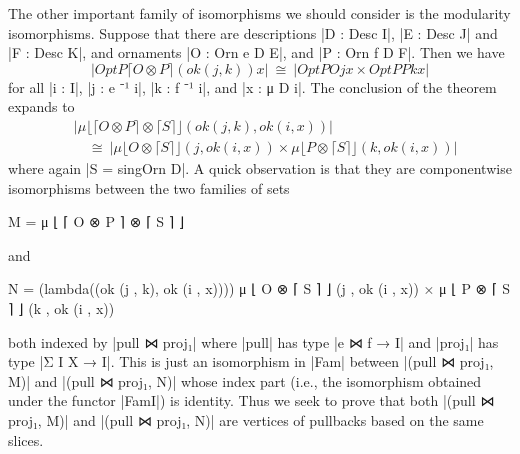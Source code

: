 The other important family of isomorphisms we should consider is the modularity isomorphisms.
Suppose that there are descriptions |D : Desc I|, |E : Desc J| and |F : Desc K|, and ornaments |O : Orn e D E|, and |P : Orn f D F|.
Then we have
\[ |OptP ⌈ O ⊗ P ⌉ (ok (j , k)) x| ~\cong~ |OptP O j x × OptP P k x| \]
for all |i : I|, |j : e ⁻¹ i|, |k : f ⁻¹ i|, and |x : μ D i|.
The conclusion of the theorem expands to
\begin{align}
& |μ ⌊ ⌈ O ⊗ P ⌉ ⊗ ⌈ S ⌉ ⌋ (ok (j , k) , ok (i , x))| \nonumber \\
& {\quad\cong~} |μ ⌊ O  ⊗ ⌈ S ⌉ ⌋ (j , ok (i , x)) × μ ⌊ P  ⊗ ⌈ S ⌉ ⌋ (k ,  ok (i , x))|
\label{eq:modularity}
\end{align}
where again |S = singOrn D|.
A quick observation is that they are componentwise isomorphisms between the two families of sets
\savecolumns
\begin{code}
M  =  μ ⌊ ⌈ O ⊗ P ⌉ ⊗ ⌈ S ⌉ ⌋
\end{code}
and
\restorecolumns
\begin{code}
N  =  (lambda((ok (j , k), ok (i , x))))
        μ ⌊ O  ⊗ ⌈ S ⌉ ⌋ (j ,  ok (i , x)) × μ ⌊ P  ⊗ ⌈ S ⌉ ⌋ (k ,  ok (i , x))
\end{code}
both indexed by |pull ⋈ proj₁| where |pull| has type |e ⋈ f → I| and |proj₁| has type |Σ I X → I|.
This is just an isomorphism in |Fam| between |(pull ⋈ proj₁, M)| and |(pull ⋈ proj₁, N)| whose index part (i.e., the isomorphism obtained under the functor |FamI|) is identity.
Thus we seek to prove that both |(pull ⋈ proj₁, M)| and |(pull ⋈ proj₁, N)| are vertices of pullbacks based on the same slices.


